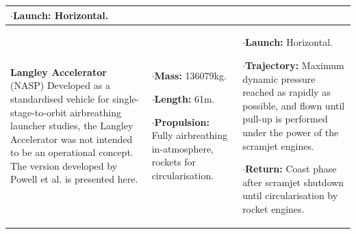 {\begin{landscape}
\begin{xltabular}{\linewidth}{|X|X|X|}
$\cdot$\textbf{Launch:} Horizontal.
\\
\hline\small \textbf{Langley Accelerator} (NASP)\cite{WCC,Powell1991,Lu1993} 
\newline  \newline Developed as a standardised vehicle for single-stage-to-orbit airbreathing launcher studies, the Langley Accelerator was not intended to be an operational concept. The version developed by Powell et al.\cite{Powell1991} is presented here. 
&
\small
{} 

$\cdot$\textbf{Mass:} 136079kg.

$\cdot$\textbf{Length:}  61m.

$\cdot$\textbf{Propulsion:} Fully airbreathing in-atmosphere, rockets for circularisation.

&
\small
{} 

$\cdot$\textbf{Launch:} Horizontal. 

$\cdot$\textbf{Trajectory:} Maximum dynamic pressure reached as rapidly as possible, and flown until pull-up is performed under the power of the scramjet engines. 

$\cdot$\textbf{Return:} Coast phase after scramjet shutdown until circularisation by rocket engines.


\end{xltabular}
\end{landscape}}
